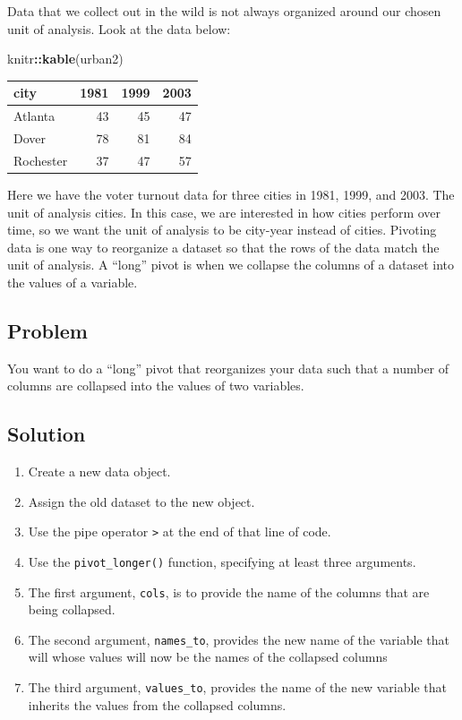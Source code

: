\documentclass[
]{book}
\newenvironment{Shaded}{\begin{snugshade}}{\end{snugshade}}
\newcommand{\FunctionTok}[1]{\textcolor[rgb]{0.13,0.29,0.53}{\textbf{#1}}}
\newcommand{\NormalTok}[1]{#1}
\newcommand{\SpecialCharTok}[1]{\textcolor[rgb]{0.81,0.36,0.00}{\textbf{#1}}}
\providecommand{\tightlist}{%
  \setlength{\itemsep}{0pt}\setlength{\parskip}{0pt}}
\begin{document}
Data that we collect out in the wild is not always organized around our chosen unit of analysis. Look at the data below:

\begin{Shaded}
\begin{Highlighting}[]
\NormalTok{knitr}\SpecialCharTok{::}\FunctionTok{kable}\NormalTok{(urban2)}
\end{Highlighting}
\end{Shaded}

\begin{tabular}{l|r|r|r}
\hline
city & 1981 & 1999 & 2003\\
\hline
Atlanta & 43 & 45 & 47\\
\hline
Dover & 78 & 81 & 84\\
\hline
Rochester & 37 & 47 & 57\\
\hline
\end{tabular}

Here we have the voter turnout data for three cities in 1981, 1999, and 2003. The unit of analysis cities. In this case, we are interested in how cities perform over time, so we want the unit of analysis to be city-year instead of cities. Pivoting data is one way to reorganize a dataset so that the rows of the data match the unit of analysis. A ``long'' pivot is when we collapse the columns of a dataset into the values of a variable.

\hypertarget{problem-26}{%
\subsection{Problem}\label{problem-26}}

You want to do a ``long'' pivot that reorganizes your data such that a number of columns are collapsed into the values of two variables.

\hypertarget{solution-25}{%
\subsection{Solution}\label{solution-25}}

\begin{enumerate}
\def\labelenumi{\arabic{enumi}.}
\tightlist
\item
  Create a new data object.
\item
  Assign the old dataset to the new object.
\item
  Use the pipe operator \texttt{\textbar{}\textgreater{}} at the end of that line of code.
\item
  Use the \texttt{pivot\_longer()} function, specifying at least three arguments.
\item
  The first argument, \texttt{cols}, is to provide the name of the columns that are being collapsed.
\item
  The second argument, \texttt{names\_to}, provides the new name of the variable that will whose values will now be the names of the collapsed columns
\item
  The third argument, \texttt{values\_to}, provides the name of the new variable that inherits the values from the collapsed columns.
\end{enumerate}
\end{document}
